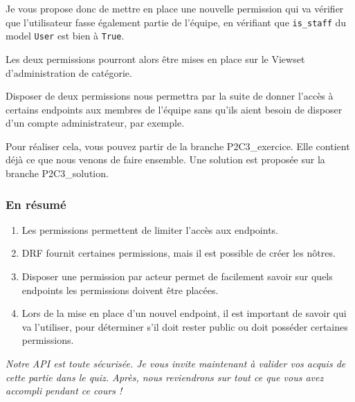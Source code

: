\documentclass[a4paper]{article}
\begin{document}
Je vous propose donc de mettre en place une {\color{monOrange}nouvelle permission} qui va vérifier que l’utilisateur fasse également partie de l’équipe, en vérifiant que {\tt is\_staff}  du model {\tt User}  est bien à {\tt True}.

Les deux permissions pourront alors être mises en place sur le Viewset d’administration de catégorie.

Disposer de deux permissions nous permettra par la suite de donner l’accès à certains endpoints aux membres de l’équipe sans qu’ils aient besoin de disposer d’un compte administrateur, par exemple.

Pour réaliser cela, vous pouvez partir de la branche P2C3\_exercice. Elle contient déjà ce que nous venons de faire ensemble. Une solution est proposée sur la branche P2C3\_solution.

\subsubsection*{En résumé}
\begin{enumerate}
\item Les permissions permettent de limiter l’accès aux endpoints.
\item DRF fournit certaines permissions, mais il est possible de créer les nôtres.
\item Disposer une permission par acteur permet de facilement savoir sur quels endpoints les permissions doivent être placées.
\item Lors de la mise en place d’un nouvel endpoint, il est important de savoir qui va l’utiliser, pour déterminer s’il doit rester public ou doit posséder certaines permissions.
\end{enumerate}
{\em Notre API est toute sécurisée. Je vous invite maintenant à valider vos acquis de cette partie dans le quiz. Après, nous reviendrons sur tout ce que vous avez accompli pendant ce cours !}
\end{document}
